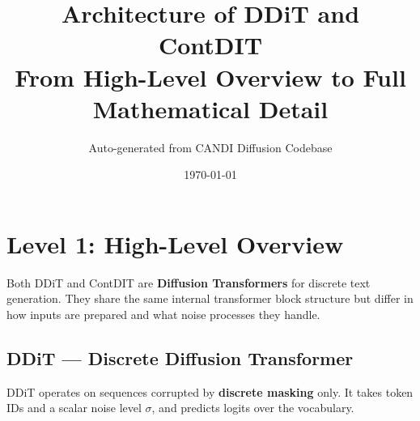 \documentclass[11pt,a4paper]{article}
\title{Architecture of DDiT and ContDIT\\[0.5em]\large From High-Level Overview to Full Mathematical Detail}
\author{Auto-generated from CANDI Diffusion Codebase}
\date{\today}
\begin{document}
\maketitle
\tableofcontents
\newpage

\section{Level 1: High-Level Overview}

Both DDiT and ContDIT are \textbf{Diffusion Transformers} for discrete text generation.
They share the same internal transformer block structure but differ in how inputs are prepared and what noise processes they handle.

\subsection{DDiT --- Discrete Diffusion Transformer}

DDiT operates on sequences corrupted by \textbf{discrete masking} only. It takes token IDs and a scalar noise level $\sigma$, and predicts logits over the vocabulary.
\end{document}
